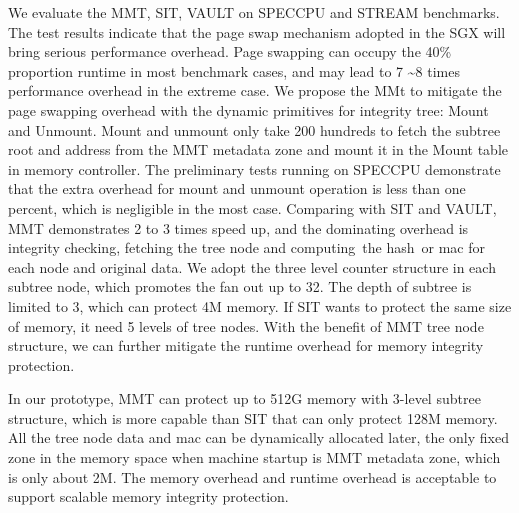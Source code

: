 \begin{bigabstract}
  We evaluate the MMT, SIT, VAULT on SPECCPU and STREAM benchmarks. The test results indicate that the page swap mechanism adopted in the SGX will bring serious performance overhead. Page swapping can occupy the 40\% proportion runtime in most benchmark cases, and may lead to 7 \sim 8 times performance overhead in the extreme case. We propose the MMt to mitigate the page swapping overhead with the dynamic primitives for integrity tree: Mount and Unmount. Mount and unmount only take 200 hundreds to fetch the subtree root and address from the MMT metadata zone and mount it in the Mount table in memory controller. The preliminary tests running on SPECCPU demonstrate that the extra overhead for mount and unmount operation is less than one percent, which is negligible in the most case. Comparing with SIT and VAULT, MMT demonstrates 2 to 3 times speed up, and the dominating overhead is integrity checking, fetching the tree node and computing the hash or mac for each  node and original data. We adopt the three level counter structure in each subtree node, which promotes the fan out up to 32. The depth of subtree is limited to 3, which can protect 4M memory. If SIT wants to protect the same size of memory, it need 5 levels of tree nodes. With the benefit of MMT tree node structure, we can further mitigate the runtime overhead for memory integrity protection. 

In our prototype, MMT can protect up to 512G memory with 3-level subtree structure, which is more capable than SIT that can only protect 128M memory. All the tree node data and mac can be dynamically allocated later, the only fixed zone in the memory space when machine startup is MMT metadata zone, which is only about 2M. The memory overhead and runtime overhead is acceptable to support scalable memory integrity protection. 

\end{bigabstract}
